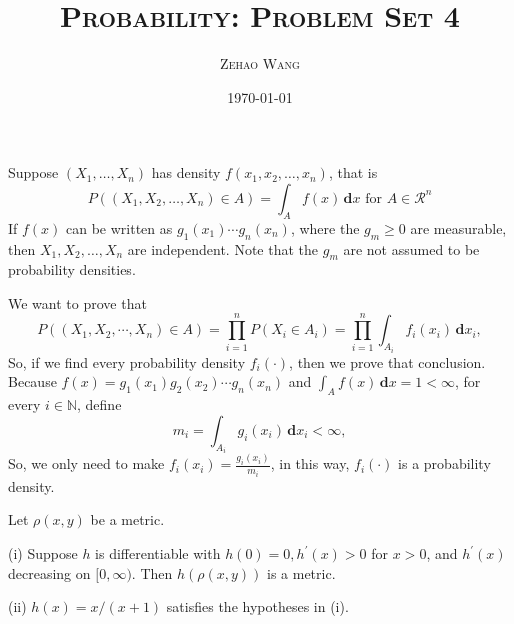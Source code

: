 \documentclass[en, normal, 11pt, black]{elegantnote}
\title{\textsc{Probability: Problem Set 4}}
\author{\textsc{Zehao Wang}}
\date{\today}
\newenvironment{exercise}[1]{\begin{tcolorbox}[colback=black!15, colframe=black!80, breakable, title=#1]}{\end{tcolorbox}}
\renewenvironment{proof}{\begin{tcolorbox}[colback=white, colframe=black!50, breakable, title=Proof. ]\setlength{\parskip}{0.8em}}{\,\\\rightline{$\square$}\end{tcolorbox}}
\newcommand{\der}{\,\mathbf{d}}
\begin{document}
    \maketitle

    \begin{exercise}{2.1.1}
        Suppose $\left(X_{1}, \ldots, X_{n}\right)$ has density $f\left(x_{1}, x_{2}, \ldots, x_{n}\right)$, that is
        \[
        P\left(\left(X_{1}, X_{2}, \ldots, X_{n}\right) \in A\right)=\int_{A} f(x) \der x \text { for } A \in \mathcal{R}^{n}
        \]
        If $f(x)$ can be written as $g_{1}\left(x_{1}\right) \cdots g_{n}\left(x_{n}\right)$, where the $g_{m} \geqslant 0$ are measurable, then $X_{1}, X_{2}, \ldots, X_{n}$ are independent. Note that the $g_{m}$ are not assumed to be probability densities. 
    \end{exercise}

    \begin{proof}
        We want to prove that 
        \[
            P((X_1,X_2,\cdots,X_n)\in A)=\prod_{i=1}^nP(X_i\in A_i)=\prod_{i=1}^n\int_{A_i}f_i(x_i) \der x_i, 
        \]
        So, if we find every probability density $f_i(\cdot)$, then we prove that conclusion. Because $f(x)=g_1(x_1)g_2(x_2)\cdots g_n(x_n)$ and $\int_Af(x)\der x=1<\infty$, for every $i\in \mathbb{N}$, define 
        \[
            m_i=\int_{A_i} g_i(x_i) \der x_i<\infty, 
        \]
        So, we only need to make $f_i(x_i)=\frac{g_i(x_i)}{m_i}$, in this way, $f_i(\cdot)$ is a probability density. 
    \end{proof}


    \begin{exercise}{2.1.3}
        Let $\rho(x, y)$ be a metric. 
        
        (i) Suppose $h$ is differentiable with $h(0)=0, h^{\prime}(x)>0$ for $x>0$, and $h^{\prime}(x)$ decreasing on $[0, \infty)$. Then $h(\rho(x, y))$ is a metric. 
        
        (ii) $h(x)=x /(x+1)$ satisfies the hypotheses in (i). 
    \end{exercise}
\end{document}
